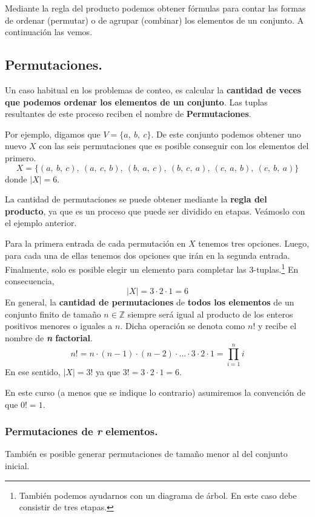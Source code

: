 \documentclass[12pt]{article}
\begin{document}
Mediante la regla del producto podemos obtener fórmulas para contar las formas de ordenar (permutar) o de agrupar (combinar) los elementos de un conjunto. A continuación las vemos.

\subsection{Permutaciones.}

Un caso habitual en los problemas de conteo, es calcular la \textbf{cantidad de veces que podemos ordenar los elementos de un conjunto}. Las tuplas resultantes de este proceso reciben el nombre de \textbf{Permutaciones}.

Por ejemplo, digamos que $V = \{a, \ b, \ c\}$. De este conjunto podemos obtener uno nuevo $X$ con las seis permutaciones que es posible conseguir con los elementos del primero.
\[
  X = \{(a, \ b, \ c), \ (a, \ c, \ b), \ (b, \ a, \ c), \ (b, \ c, \ a), \ (c, \ a, \ b), \ (c, \ b, \ a)\}
\]
donde $|X| = 6$.

La cantidad de permutaciones se puede obtener mediante la \textbf{regla del producto}, ya que es un proceso que puede ser dividido en etapas. Veámoslo con el ejemplo anterior.

Para la primera entrada de cada permutación en $X$ tenemos tres opciones. Luego, para cada una de ellas tenemos dos opciones que irán en la segunda entrada. Finalmente, solo es posible elegir un elemento para completar las $3$-tuplas.\footnote{También podemos ayudarnos con un diagrama de árbol. En este caso debe consistir de tres etapas.} En consecuencia,
\[
  |X| = 3 \cdot 2 \cdot 1 = 6
\]
En general, la \textbf{cantidad de permutaciones} de \textbf{todos los elementos} de un conjunto finito de tamaño $n \in \mathbb{Z}$ siempre será igual al producto de los enteros positivos menores o iguales a $n$. Dicha operación se denota como $n!$ y recibe el nombre de \textbf{\textit{n} factorial}.
\[
  n! = n \cdot (n - 1) \cdot (n - 2) \cdot \ldots \cdot 3 \cdot 2 \cdot 1 = \prod_{i = 1}^{n} i
\]
En ese sentido, $|X| = 3!$ ya que $3! = 3 \cdot 2 \cdot 1 = 6$.

En este curso (a menos que se indique lo contrario) asumiremos la convención de que $0! = 1$.

\subsubsection{Permutaciones de \textit{r} elementos.}

También es posible generar permutaciones de tamaño menor al del conjunto inicial.
\end{document}
